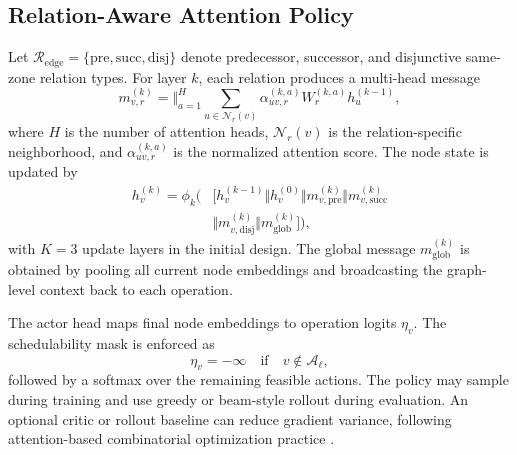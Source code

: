 \subsection{Relation-Aware Attention Policy}
\begin{addedtwoblock}
Let $\mathcal{R}_{\mathrm{edge}}=\{\mathrm{pre},\mathrm{succ},\mathrm{disj}\}$ denote predecessor, successor, and disjunctive same-zone relation types. For layer $k$, each relation produces a multi-head message
\begin{equation}
  m_{v,r}^{(k)} = \big\Vert_{a=1}^{H} \sum_{u\in\mathcal{N}_r(v)} \alpha_{uv,r}^{(k,a)} W_{r}^{(k,a)}h_u^{(k-1)},
  \label{eq:relation_message}
\end{equation}
where $H$ is the number of attention heads, $\mathcal{N}_r(v)$ is the relation-specific neighborhood, and $\alpha_{uv,r}^{(k,a)}$ is the normalized attention score. The node state is updated by
\begin{equation}
\begin{aligned}
  h_v^{(k)}=\phi_k(&[h_v^{(k-1)}\Vert h_v^{(0)}\Vert m_{v,\mathrm{pre}}^{(k)}\Vert m_{v,\mathrm{succ}}^{(k)} \\
  &\Vert m_{v,\mathrm{disj}}^{(k)}\Vert m_{\mathrm{glob}}^{(k)}]),
\end{aligned}
  \label{eq:gat_update}
\end{equation}
with $K=3$ update layers in the initial design. The global message $m_{\mathrm{glob}}^{(k)}$ is obtained by pooling all current node embeddings and broadcasting the graph-level context back to each operation.

The actor head maps final node embeddings to operation logits $\eta_v$. The schedulability mask is enforced as
\begin{equation}
  \eta_v=-\infty \quad \mathrm{if}\quad v\notin\mathcal{A}_\ell,
  \label{eq:actor_mask}
\end{equation}
followed by a softmax over the remaining feasible actions. The policy may sample during training and use greedy or beam-style rollout during evaluation. An optional critic or rollout baseline can reduce gradient variance, following attention-based combinatorial optimization practice \cite{kool2019attention}.
\end{addedtwoblock}

